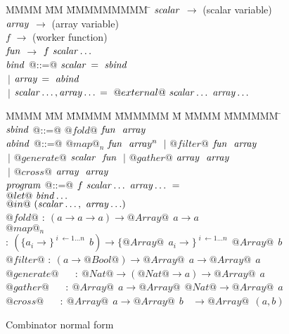\begin{figure}
\begin{tabbing}
MMMM        \= MM \= MMMMMMMMM \= \kill
$\mathit{scalar}$    \> $\to$ \> (scalar variable) \\
$\mathit{array}$     \> $\to$ \> (array variable)  \\
$f$         \> $\to$ \> (worker function) \\
$\mathit{fun}$       \> $\to$ \> $f~\mathit{scalar}\ldots$
\\[2ex]
$\mathit{bind}$      \> @::=@ \> $\mathit{scalar}$ \> $=~\mathit{sbind}$ \\
            \> $~|$  \> $\mathit{array}$  \> $=~\mathit{abind}$ \\
            \> $~|$  \> $\mathit{scalar}\ldots,\mathit{array}\ldots$ \> $=~@external@~\mathit{scalar}\ldots~\mathit{array}\ldots$
\end{tabbing}

\begin{tabbing}
MMMM        \= MM \= MMMMM \= MMMMMM \= M \= MMMM \= MMMMMM \= \kill
$\mathit{sbind}$     \> @::=@ \> $@fold@$     \> $\mathit{fun}~~ \mathit{array}$
\\[1ex]

$\mathit{abind}$     \> @::=@ \> $@map@_n$    \> $\mathit{fun}~~ \mathit{array}^n$ 
            \> $~|$  \> $@filter@$   \> $\mathit{fun}~~ \mathit{array}$   \\
            \> $~|$  \> $@generate@$ \> $\mathit{scalar}~~ \mathit{fun}$  
            \> $~|$  \> $@gather@$   \> $\mathit{array}~~ \mathit{array}$ \\
            \> $~|$  \> $@cross@$    \> $\mathit{array}~~ \mathit{array}$
\\[1ex]
$\mathit{program}$  \> @::=@ \> $f~\mathit{scalar}\ldots~\mathit{array}\ldots~=$ \\
            \>          \> $@let@~\mathit{bind}\ldots$                  \\
            \>          \> $@in@~(\mathit{scalar}\ldots,~\mathit{array}\ldots)$
\\[3ex]
$@fold@$     \> $:~ (a \to a \to a) \to @Array@~~ a \to a$     \\
$@map@_n$    \> $:~ (\{a_i          \to\}^{\;i\; \gets 1 \dots n}~~ b)  \to
                       \{@Array@~~ a_i \to\}^{\;i\; \gets 1 \dots n}~~ @Array@~~ b$ \\
$@filter@$   \> $:~ (a \to @Bool@) \to @Array@~~ a \to @Array@~~ a$      \\
$@generate@$ \> ~~ $:~ @Nat@ \to (@Nat@ \to a) \to @Array@~~ a$          \\
$@gather@$   \> ~~ $:~ @Array@~~ a \to @Array@~~ @Nat@  \to @Array@~~ a$ \\
$@cross@$    \> ~~ $:~ @Array@~~ a \to @Array@~~ b ~~~~ \to @Array@~~ (a, b)$
\end{tabbing}
\caption{Combinator normal form}
\label{f:CombinatorNormalForm}
\end{figure}

